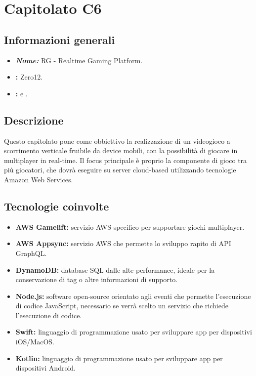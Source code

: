 \section{Capitolato C6}

\subsection{Informazioni generali}
\begin{itemize}
\item \textbf{\emph{Nome:}} RG - Realtime Gaming Platform.
\item \textbf{\commitProg:} Zero12.
\item \textbf{\proponProg:} \VT{} e \CR.
\end{itemize}

\subsection{Descrizione}
Questo capitolato pone come obbiettivo la realizzazione di un videogioco a scorrimento verticale fruibile da device mobili, con la possibilità di giocare in multiplayer in real-time. Il focus principale è proprio la componente di gioco tra più giocatori, che dovrà eseguire su server cloud-based utilizzando tecnologie Amazon Web Services.

\subsection{Tecnologie coinvolte}
\begin{itemize}
\item \textbf{AWS Gamelift:} servizio AWS specifico per supportare giochi multiplayer.
\item \textbf{AWS Appsync:} servizio AWS che permette lo sviluppo rapito di API GraphQL.
\item \textbf{DynamoDB:} database SQL dalle alte performance, ideale per la conservazione di tag o altre informazioni di supporto.
\item \textbf{Node.js:} software open-source orientato agli eventi che permette l'esecuzione di codice JavaScript, necessario se verrà scelto un servizio che richiede l'esecuzione di codice.
\item \textbf{Swift:} linguaggio di programmazione usato per sviluppare app per dispositivi iOS/MacOS.
\item \textbf{Kotlin:} linguaggio di programmazione usato per sviluppare app per dispositivi Android.
\end{itemize}

